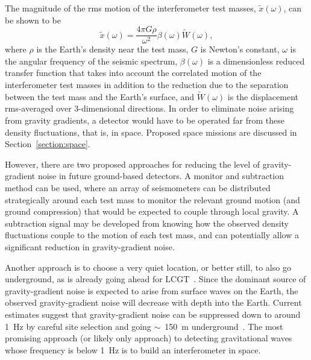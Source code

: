 \documentclass{article}
\begin{document}
The magnitude of the rms motion of the interferometer test masses,
$\tilde{x}(\omega)$, can be shown to be~\cite{Thorne:1998}
%
\begin{equation}
  \tilde{x}(\omega) = \frac{4 \pi G \rho}{\omega^{2}} \beta(\omega)
\tilde{W}(\omega),
  \label{equation:GGN}
\end{equation}
%
where $\rho$ is the Earth's density near the test mass, $G$ is
Newton's constant, $\omega$ is the angular frequency of the seismic
spectrum, $\beta(\omega)$ is a dimensionless reduced transfer function
that takes into account the correlated motion of the interferometer
test masses in addition to the reduction due to the separation between
the test mass and the Earth's surface, and $\tilde{W}(\omega)$ is the
displacement rms-averaged over 3-dimensional directions. In order to
eliminate noise arising from gravity gradients, a detector would have
to be operated far from these density fluctuations, that is, in space.
Proposed space missions are discussed in Section~\ref{section:space}.

However, there are two proposed approaches for reducing the level of gravity-gradient noise in future ground-based detectors. A monitor and subtraction
method can be used, where an array of seismometers can be distributed
strategically around each test mass to monitor the relevant ground motion (and
ground compression) that would be expected to couple through local gravity. A
subtraction signal may be developed from knowing how the observed density
fluctuations couple to the motion of each test mass, and can potentially allow a
significant reduction in gravity-gradient noise.

Another approach is to choose a very quiet location, or better still, to also go
underground, as is already going ahead for LCGT~\cite{Miyoki:2005}. Since the
dominant source of gravity-gradient noise is expected to arise from surface
waves on the Earth, the observed gravity-gradient noise will decrease with depth
into the Earth. Current estimates suggest that gravity-gradient noise can be
suppressed down to around 1~Hz by careful site selection and going $\sim$~150~m
underground~\cite{Beker:2011}. The most promising approach (or likely only
approach) to detecting gravitational waves whose frequency is below 1~Hz is to
build an interferometer in space.

\end{document}
